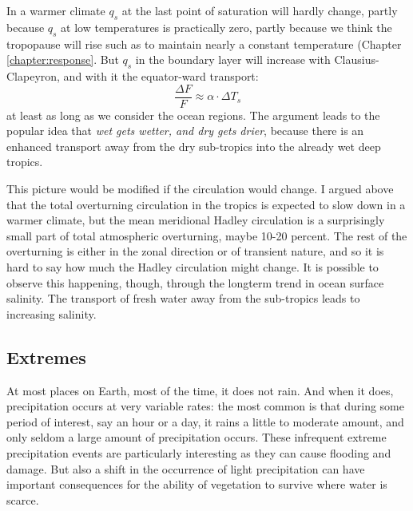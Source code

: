 \documentclass[12pt]{book}
\begin{document}
In a warmer climate $q_s$ at the last point of saturation will hardly change, partly because $q_s$ at low temperatures is practically zero, partly because we think the tropopause will rise such as to maintain nearly a constant temperature (Chapter \ref{chapter:response}. But $q_s$ in the boundary layer will increase with Clausius-Clapeyron, and with it the equator-ward transport:
$$ \frac{\Delta F}{F} \approx \alpha \cdot \Delta T_s  $$
at least as long as we consider the ocean regions. The argument leads to the popular idea that {\em wet gets wetter, and dry gets drier}, because there is an enhanced transport away from the dry sub-tropics into the already wet deep tropics.

This picture would be modified if the circulation would change. I argued above that the total overturning circulation in the tropics is expected to slow down in a warmer climate, but the mean meridional Hadley circulation is a surprisingly small part of total atmospheric overturning, maybe 10-20 percent. The rest of the overturning is either in the zonal direction or of transient nature, and so it is hard to say how much the Hadley circulation might change. It is possible to observe this happening, though, through the longterm trend in ocean surface salinity. The transport of fresh water away from the sub-tropics leads to increasing salinity.


\subsection{Extremes}
At most places on Earth, most of the time, it does not rain. And when it does, precipitation occurs at very variable rates: the most common is that during some  period of interest, say an hour or a day, it rains a little to moderate amount, and only seldom a large amount of precipitation occurs. These infrequent extreme precipitation events are particularly interesting as they can cause flooding and damage. But also a shift in the occurrence of light precipitation can have important consequences for the ability of vegetation to survive where water is scarce. 
\end{document}
